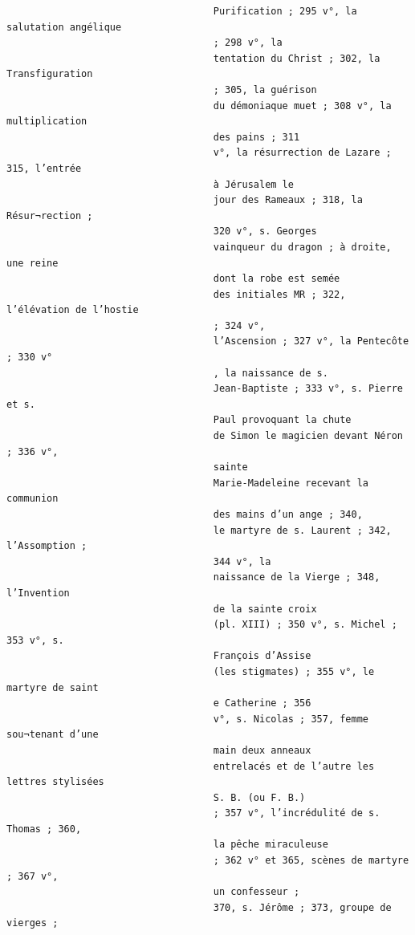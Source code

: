 \documentclass[a4paper,12pt,twoside]{book}
\begin{document}
\begin{verbatim}
                                    Purification ; 295 v°, la salutation angélique
                                    ; 298 v°, la
                                    tentation du Christ ; 302, la Transfiguration
                                    ; 305, la guérison
                                    du démoniaque muet ; 308 v°, la multiplication
                                    des pains ; 311
                                    v°, la résurrection de Lazare ; 315, l’entrée
                                    à Jérusalem le
                                    jour des Rameaux ; 318, la Résur¬rection ;
                                    320 v°, s. Georges
                                    vainqueur du dragon ; à droite, une reine 
                                    dont la robe est semée
                                    des initiales MR ; 322, l’élévation de l’hostie 
                                    ; 324 v°,
                                    l’Ascension ; 327 v°, la Pentecôte ; 330 v°
                                    , la naissance de s.
                                    Jean-Baptiste ; 333 v°, s. Pierre et s.
                                    Paul provoquant la chute
                                    de Simon le magicien devant Néron ; 336 v°,
                                    sainte
                                    Marie-Madeleine recevant la communion 
                                    des mains d’un ange ; 340,
                                    le martyre de s. Laurent ; 342, l’Assomption ;
                                    344 v°, la
                                    naissance de la Vierge ; 348, l’Invention
                                    de la sainte croix
                                    (pl. XIII) ; 350 v°, s. Michel ; 353 v°, s.
                                    François d’Assise
                                    (les stigmates) ; 355 v°, le martyre de saint
                                    e Catherine ; 356
                                    v°, s. Nicolas ; 357, femme sou¬tenant d’une
                                    main deux anneaux
                                    entrelacés et de l’autre les lettres stylisées
                                    S. B. (ou F. B.)
                                    ; 357 v°, l’incrédulité de s. Thomas ; 360, 
                                    la pêche miraculeuse
                                    ; 362 v° et 365, scènes de martyre ; 367 v°,
                                    un confesseur ;
                                    370, s. Jérôme ; 373, groupe de vierges ; 

\end{verbatim}
\end{document}
